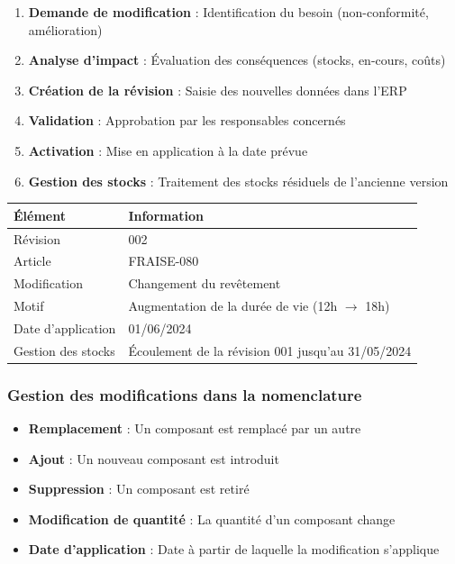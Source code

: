 \documentclass{article}
\begin{document}
\begin{table}[h]
\begin{enumerate}
    \item \textbf{Demande de modification} : Identification du besoin (non-conformité, amélioration)
    \item \textbf{Analyse d'impact} : Évaluation des conséquences (stocks, en-cours, coûts)
    \item \textbf{Création de la révision} : Saisie des nouvelles données dans l'ERP
    \item \textbf{Validation} : Approbation par les responsables concernés
    \item \textbf{Activation} : Mise en application à la date prévue
    \item \textbf{Gestion des stocks} : Traitement des stocks résiduels de l'ancienne version
\end{enumerate}

\begin{tcolorbox}[colback=orangeclair, colframe=orange!70!black, title=Exemple : Modification technique d'un outil]
\begin{tabular}{|l|l|}
\hline
\textbf{Élément} & \textbf{Information} \\
\hline
Révision & 002 \\
Article & FRAISE-080 \\
Modification & Changement du revêtement \\
Motif & Augmentation de la durée de vie (12h $\rightarrow$ 18h) \\
Date d'application & 01/06/2024 \\
Gestion des stocks & Écoulement de la révision 001 jusqu'au 31/05/2024 \\
\hline
\end{tabular}
\end{tcolorbox}

\subsubsection{Gestion des modifications dans la nomenclature}

\begin{itemize}
    \item \textbf{Remplacement} : Un composant est remplacé par un autre
    \item \textbf{Ajout} : Un nouveau composant est introduit
    \item \textbf{Suppression} : Un composant est retiré
    \item \textbf{Modification de quantité} : La quantité d'un composant change
    \item \textbf{Date d'application} : Date à partir de laquelle la modification s'applique
\end{itemize}


\end{table}
\end{document}
